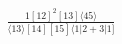 \documentclass[varwidth, border=5pt]{standalone}
\begin{document}
\begin{my}
$\begin{gathered}
\scriptscriptstyle\frac{1[12]^2[13]⟨45⟩}{⟨13⟩[14][15]⟨1|2+3|1]}
\end{gathered}$
\end{my}
\end{document}
